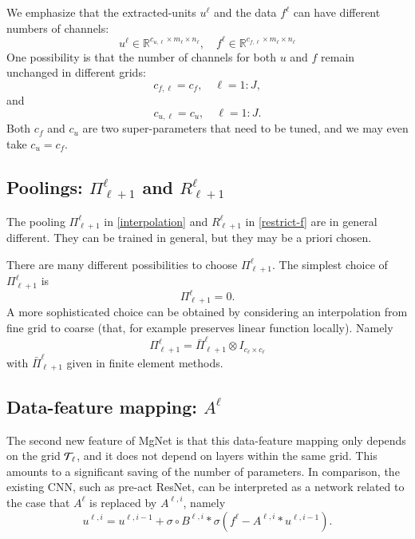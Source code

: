 We emphasize that the extracted-units $u^\ell$ and the data $f^\ell$ can have
different numbers of channels:\
\begin{equation}
\label{uf-channels}
u^\ell\in \mathbb{R}^{c_{u,\ell}\times m_\ell\times n_\ell  }, \quad
f^\ell\in \mathbb{R}^{c_{f,\ell} \times m_\ell\times n_\ell }
\end{equation}
One possibility is that the number of channels for both $u$ and $f$ remain
unchanged in different grids:  
\begin{equation}
\label{cfl}
c_{f,\ell}=c_f, \quad \ell=1:J,   
\end{equation}
and 
\begin{equation}
\label{ufl}
c_{u,\ell}=c_{u}, \quad \ell=1:J.   
\end{equation}
Both $c_f$ and $c_{u}$ are two super-parameters that need to be tuned, 
and we may even take $c_u = c_f$.

\subsection{Poolings: $\Pi_{\ell+1}^\ell$ and $R_{\ell+1}^\ell$}
The pooling $\Pi_{\ell+1}^\ell$ in \eqref{interpolation} and
$R_{\ell+1}^\ell$ in \eqref{restrict-f} are in general different.
They can be trained in general, but they may be a priori chosen.

There are many different possibilities to choose $\Pi_{\ell+1}^\ell$. 
The simplest choice of $\Pi_{\ell+1}^\ell$ is 
\begin{equation}
\label{eq:8}
\Pi_{\ell+1}^\ell=0.
\end{equation}
A more sophisticated choice can be obtained by considering an
interpolation from fine grid to coarse (that, for example preserves linear function
locally).  Namely
\begin{equation}
\label{Pi}
\Pi_{\ell+1}^\ell=\bar\Pi_{\ell+1}^\ell \otimes I_{c_\ell\times c_\ell} 
\end{equation}
with $\bar\Pi_{\ell+1}^\ell$ given in finite element methods.



\subsection{Data-feature mapping: $A^{\ell}$}
The second new feature of MgNet is that this data-feature mapping
only depends on the grid ${\cal T}_\ell$, and it does not depend on layers
within the same grid.  This amounts to a significant saving of the number of
parameters.  In comparison, the existing CNN, such as pre-act ResNet, can be
interpreted as a network related to the case that $A^{\ell}$ is
replaced by $A^{\ell, i}$, namely
\begin{equation}\label{u-resnet}
u^{\ell,i} = u^{\ell,i-1} + \sigma \circ B^{\ell,i} \ast \sigma (f^\ell -  A^{\ell,i} \ast u^{\ell,i-1}).
\end{equation}

